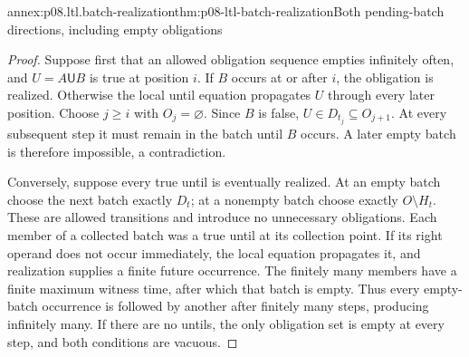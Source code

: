 \begin{annexitem}{annex:p08.ltl.batch-realization}{thm:p08-ltl-batch-realization}{Both pending-batch directions, including empty obligations}
\begin{proof}
Suppose first that an allowed obligation sequence empties infinitely
often, and \(U=A\mathbin{\mathsf U}B\) is true at position
\(i\). If \(B\) occurs at or after \(i\), the obligation
is realized. Otherwise the local until equation propagates
\(U\) through every later position. Choose \(j\geq i\)
with \(O_j=\varnothing\). Since \(B\) is false,
\(U\in D_{t_j}\subseteq O_{j+1}\). At every subsequent step
it must remain in the batch until \(B\) occurs. A later empty
batch is therefore impossible, a contradiction.

Conversely, suppose every true until is eventually realized.
At an empty batch choose the next batch exactly \(D_t\);
at a nonempty batch choose exactly \(O\setminus H_t\).
These are allowed transitions and introduce no unnecessary
obligations. Each member of a collected batch was a true until
at its collection point. If its right operand does not occur
immediately, the local equation propagates it, and realization
supplies a finite future occurrence. The finitely many members
have a finite maximum witness time, after which that batch is
empty. Thus every empty-batch occurrence is followed by another
after finitely many steps, producing infinitely many. If there
are no untils, the only obligation set is empty at every step,
and both conditions are vacuous.
\end{proof}
\end{annexitem}

